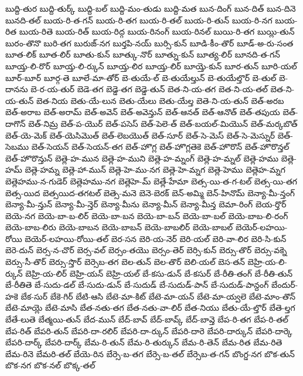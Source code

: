 {బుద్ది-తుర
బుద్ది-తుర్క్
బుద్ది-బల్
బుద్ది-మం-తుడు
బుద్ది-మత
బున-దింగ్
బున-దిత్
బున-దినె
బునది-తల్
బుయ-రి-త-గన్
బుయ-రి-తగ
బుయ-రి-తల్
బుయ-రి-తున్
బుయ-రి-నగ
బుయ-రిత
బుయ-రితె
బుయ-రిత్
బుయ-రిద్గ
బుయ-రినంగ్
బుయ-రినల్
బుయి-రి-తగ
బుయ్లి-తున్
బురం-తొనొ
బురి-తగ
బురుజ్-నగ
బుర్తపి-నయ్
బుర్సి-కున్
బూడి-కీం-తొర్
బూడ్-అ-రు-సంత
బూత-లిక్
బూత-లిర్
బూతు-కున్
బూత్కు-నొర్
బూత్ను-కున్
బూత్య-లిర్
బూనది-త-గన్
బూయ్త-లి-రొర్
బూయ్త-లి-ర్కున్
బూయ్త-లిర
బూయ్త-లిర్
బూయ్తె-కున్
బూర-తున్
బూరి-యల్
బూర్-బూర్
బూర్గ-తె
బూలే-మా-తోర్
బె-తుయే-ల్
బె-తుయేల్తున్
బె-తుయేల్తొర్
బె-తుల్
బె-దానను
బె-ర-య-తుర్
బెడె-తగ
బెడ్డె-తగ
బెడ్డె-తున్
బెత-ని-య-తగ
బెత-ని-య-తల్
బెత-ని-య-తున్
బెత-నియ
బెతు-యే-లున
బెతు-యేలు
బెతు-యేల్త
బెతె-ని-య-తున్
బెత్-అరబ
బెత్-అరాబ
బెత్-అరామ్
బెత్-అవెన్
బెత్-అవెన్తున్
బెత్-ఆనత్
బెత్-ఆనొత్
బెత్-తపుయ
బెత్-దాగొన్
బెత్-నిమ్ర
బెత్-ప-యొర్
బెత్-పసెస్
బెత్-పెలె-త్
బెత్-బయల్-మియొన్
బెత్-మర్కబొత్
బెత్-యె-మెక్
బెత్-యెసిమొత్
బెత్-లెబయొత్
బెత్-సూర్
బెత్-సె-మెస్
బెత్-సె-మెస్నుర్
బెత్-సెబము
బెత్-సెయన్
బెత్-సెయన్-తగ
బెత్-హొగ్ల
బెత్-హొగ్లతెకె
బెత్-హొరొన్
బెత్-హొరొన్తల్
బెత్-హొరొన్తున్
బెత్లె-హ-మున
బెత్లె-హ-ముని
బెత్లె-హ-మ్నంగ్
బెత్లె-హ-మ్నల్
బెత్లె-హము
బెత్లె-హమ్
బెత్లె-హమ్న
బెత్లె-హా-మున్
బెత్లె-హె-ము-నగ
బెత్లె-హె-మ్నగ
బెత్లె-హెము
బెత్లెహ-మ్నగ
బెత్లెహము-న-గుడెర్
బెత్లెహము-నగ
బెత్లెహె-మ్
బెత్లే-హేమా
బెత్స-యి-త-గ-టల్
బెత్స-యి-తగ
బెత్స-యిద
బెత్సయిద-తగటల్
బెత్సె-మనె
బెనె-బెరక్
బెన్-అమ్మి
బెన్-హినొమ్
బెన్యా-మీ-న్తంగ్
బెన్యా-మీ-న్తున్
బెన్యా-మీ-న్తెర్
బెన్యా-మీను
బెన్యా-మీన్
బెన్యా-మీన్త
బెమా-రింగ్
బెయ-ర్తొర్
బెయె-నగ
బెయె-బా-బ-లిర్
బెయె-బా-బన
బెయె-బా-బన్
బెయె-బా-బల్
బెయె-బాబ-లి-రంగ్
బెయె-బాబ-లిరు
బెయె-బాబన
బెయె-బాబన్
బెయె-బాబలిర్
బెయె-బాబల్
బెయెర్-లహయి-రోయి
బెయెర్-లహయి-రోయి-తల్
బెర-సన
బెరి-య-నెర్
బెరి-యల్
బెరి-వా-లిర
బెరి-సి-కున్
బెరె-దున్
బెర్స-న-చొర్
బెర్స-వల్
బెర్సం-తయొ
బెర్సం-తెర్
బెర్సి-కున్
బెర్సు-తొర్
బెర్సు-వక్నె
బెర్సు-సీ-తొర్
బెర్సు-స్తొర్
బెర్సెబ-తగ
బెల-తున్
బెల-తొర్
బెలి-యల్
బెస-తన్
బెహ్రి-య-లి-ర్కున్
బెహ్రి-య-లిర్
బెహ్రి-యన్
బెహ్రి-యల్
బే-కసు-డున్
బే-కసుర్
బే-రీతి-తంగ్
బే-రీతి-తున్
బే-రీతితె
బే-సుదు-డల్
బే-సుదు-డున్
బే-సుదుడ్
బే-సుదుడ్-పాన్
బే-సుదుడ్-పాన్దంగ్
బేందుర్-హకె
బేక-సుర్
బేకె-గిర్
బేటి-ఆసి
బేటె-మా-కిట్
బేటె-మా-యన్
బేటె-మా-య్వలె
బేటె-మాం-తొన్
బేటె-మాయ్లె
బేటె-మాసి
బేత-నతు-తగ
బేత-నతు-వా-లిర్
బేత-నియు
బేతు-యే-ల్తొర్
బేతె-ల్తగ
బేతే-లుతె
బేత్మయి-తున్
బేద-మున్
బేద్-బావ్
బేద్-బావ్క్
బేద్-బావ్తె
బేప-రి-తగ
బేప-రి-తల్
బేప-రిత్
బేపరి-తున్
బేపరి-దా-రలిర్
బేపరి-దా-ర్కున్
బేపరి-దారె
బేపరి-దార్కున్
బేపరి-దార్కె
బేపరి-దార్క్
బేపరి-దార్క్
బేమ-రి-తున్
బేమ-రి-తుర్కున్
బేమ-రి-తెన్
బేమ-రిత
బేమ-రితె
బేమ-రినె
బేమరి-తల్
బేయె-రిన
బేర్సె-బ-తగ
బేర్సె-బ-తల్
బేర్సెబ-త-గన్
బొంగ్డ-నగ
బొక-తున్
బొక-నగ
బొక-నల్
బొక్క-తల్
}
